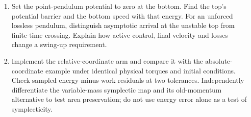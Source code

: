 \begin{enumerate}
\item\label{ex:lagrangian_15} Set the point-pendulum potential to zero at the bottom. Find the top's potential barrier and the bottom speed with that energy. For an unforced lossless pendulum, distinguish asymptotic arrival at the unstable top from finite-time crossing. Explain how active control, final velocity and losses change a swing-up requirement.

\item\label{ex:lagrangian_16} Implement the relative-coordinate arm and compare it with the absolute-coordinate example under identical physical torques and initial conditions. Check sampled energy-minus-work residuals at two tolerances. Independently differentiate the variable-mass symplectic map and its old-momentum alternative to test area preservation; do not use energy error alone as a test of symplecticity.
\end{enumerate}
